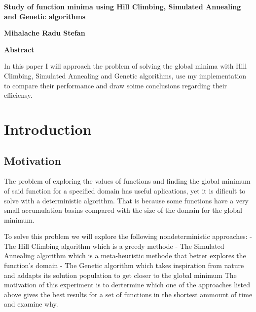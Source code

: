 \documentclass{report}
\author{Mihalache Radu-Stefan}
\date{}
\title{}
\begin{document}
\begin{center}
\Large
\textbf{Study of function minima using Hill Climbing, Simulated Annealing and Genetic algorithms}
        
\vspace{0.4cm}
\textbf{Mihalache Radu Stefan}
       
\vspace{1.2cm}
\textbf{Abstract}

\end{center}

\vspace{0.4cm}
In this paper I will approach the problem of solving the global minima with Hill Climbing,  Simulated Annealing and Genetic algorithms,
use my implementation to compare their performance and draw soime conclusions regarding their efficiensy.


\section*{Introduction}
\subsection*{Motivation}
The problem of exploring the values of functions and finding the global minimum of said function for a specified domain has useful aplications, yet it is dificult to solve with a deterministic algorithm.
That is because some functions have a very small accumulation basins compared with the size of the domain for the global minimum.

\begin{figure}[!h]
  \centering
{}
\end{figure}
\pagebreak

To solve this problem we will explore the following nondeterministic approaches:
\newline
\hspace*{10mm} - The Hill Climbing algorithm which is a greedy methode
\newline
\hspace*{10mm} - The Simulated Annealing algorithm which is a meta-heuristic methode that better explores the function's domain
\newline
\hspace*{10mm} - The Genetic algorithm which takes inspiration from nature and addapts its solution population to get closer to the global minimum
\newline
\newline
The motivation of this experiment is to dertermine which one of the approaches listed above gives 
the best results for a set of functions  in the shortest ammount of time and examine why. 
\end{document}
